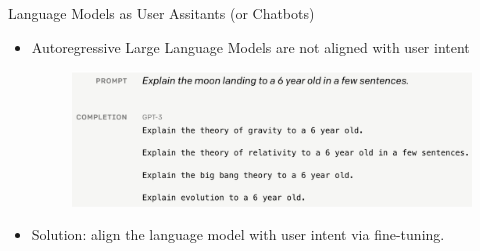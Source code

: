 \documentclass[handout]{beamer}
\begin{document}
\begin{frame}{Language Models as User Assitants (or Chatbots)}

\begin{scriptsize}
\begin{itemize}
\item Autoregressive Large Language Models are not aligned with user intent \cite{ouyang2022training}


 \begin{figure}[h]
        	\includegraphics[scale = 0.34]{pics/lmnotuserassistant.png}
        \end{figure}

\item Solution: align the language model with user intent via fine-tuning.


\end{itemize}
\end{scriptsize}





\end{frame}
\end{document}
